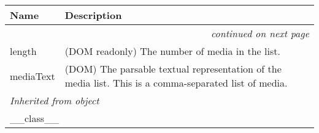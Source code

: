    \vspace{-1cm}
\hspace{\varindent}\begin{longtable}{|p{\varnamewidth}|p{\vardescrwidth}|l}
\cline{1-2}
\cline{1-2} \centering \textbf{Name} & \centering \textbf{Description}& \\
\cline{1-2}
\endhead\cline{1-2}\multicolumn{3}{r}{\small\textit{continued on next page}}\\\endfoot\cline{1-2}
\endlastfoot\raggedright l\-e\-n\-g\-t\-h\- & \raggedright (DOM readonly) The number of media in the list.&\\
\cline{1-2}
\raggedright m\-e\-d\-i\-a\-T\-e\-x\-t\- & \raggedright (DOM) The parsable textual representation of the media list.
This is a comma-separated list of media.&\\
\cline{1-2}
\multicolumn{2}{|l|}{\textit{Inherited from object}}\\
\multicolumn{2}{|p{\varwidth}|}{\raggedright \_\_class\_\_}\\
\cline{1-2}
\end{longtable}

